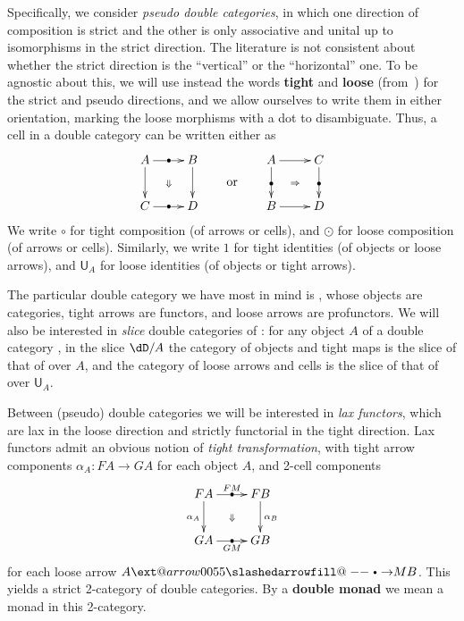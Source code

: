 \documentclass{amsart}
\makeatletter
\def\rightbulletarrowfill@{%
  \slashedarrowfill@\relbar\relbar{\raisebox{1.25pt}{$\scriptscriptstyle\bullet$}}\rightarrow}
\newcommand\xbulletrightarrow[2][]{%
  \ext@arrow 0055{\rightbulletarrowfill@}{#1}{#2}}
\let\xbto\xbulletrightarrow
\newcommand{\hunit}[1]{\mathsf{U}_{#1}}
\makeatother
\begin{document}
Specifically, we consider \emph{pseudo double categories}, in which one direction of composition is strict and the other is only associative and unital up to isomorphisms in the strict direction.
The literature is not consistent about whether the strict direction is the ``vertical'' or the ``horizontal'' one.
To be agnostic about this, we will use instead the words \textbf{tight} and \textbf{loose} (from~\cite{ls:limlax}) for the strict and pseudo directions, and we allow ourselves to write them in either orientation, marking the loose morphisms with a dot to disambiguate.
Thus, a cell in a double category can be written either as
\[ \vcenter{\xymatrix{ A \ar[r]|{\bullet} \ar[d] \ar@{}[dr]|{\Downarrow}& B \ar[d] \\ C \ar[r]|{\bullet} & D } }
\qquad\text{or}\qquad
\vcenter{\xymatrix{ A \ar[d]|{\bullet} \ar[r] \ar@{}[dr]|{\Rightarrow}& C \ar[d]|{\bullet} \\ B \ar[r] & D } }
\]
We write $\circ$ for tight composition (of arrows or cells), and $\odot$ for loose composition (of arrows or cells).
Similarly, we write $1$ for tight identities (of objects or loose arrows), and $\hunit{A}$ for loose identities (of objects or tight arrows).

The particular double category we have most in mind is \dCat, whose objects are categories, tight arrows are functors, and loose arrows are profunctors.
We will also be interested in \emph{slice} double categories of \dCat: for any object $A$ of a double category \dD, in the slice $\dD/A$ the category of objects and tight maps is the slice of that of \dD over $A$, and the category of loose arrows and cells is the slice of that of \dD over $\hunit A$.

Between (pseudo) double categories we will be interested in \emph{lax functors}, which are lax in the loose direction and strictly functorial in the tight direction.
Lax functors admit an obvious notion of \emph{tight transformation}, with tight arrow components $\alpha_A:FA\to GA$ for each object $A$, and 2-cell components
\[ \vcenter{\xymatrix{ FA \ar[r]|{\bullet}^{FM} \ar[d]_{\alpha_A} \ar@{}[dr]|{\Downarrow}& FB \ar[d]^{\alpha_B} \\ GA \ar[r]|{\bullet}_{GM} & GB } } \]
for each loose arrow $A\xbto{M} B$.
This yields a strict 2-category of double categories.
By a \textbf{double monad} we mean a monad in this 2-category.
\end{document}
